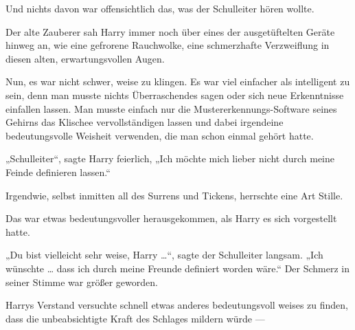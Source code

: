 Und nichts davon war offensichtlich das, was der Schulleiter hören wollte.

Der alte Zauberer sah Harry immer noch über eines der ausgetüftelten Geräte hinweg an, wie eine gefrorene Rauchwolke, eine schmerzhafte Verzweiflung in diesen alten, erwartungsvollen Augen.

Nun, es war nicht schwer, weise zu klingen. Es war viel einfacher als intelligent zu sein, denn man musste nichts Überraschendes sagen oder sich neue Erkenntnisse einfallen lassen. Man musste einfach nur die Mustererkennungs-Software seines Gehirns das Klischee vervollständigen lassen und dabei irgendeine bedeutungsvolle Weisheit verwenden, die man schon einmal gehört hatte.

„Schulleiter“, sagte Harry feierlich,
„Ich möchte mich lieber nicht durch meine Feinde definieren lassen.“

Irgendwie, selbst inmitten all des Surrens und Tickens, herrschte eine Art Stille.

Das war etwas bedeutungsvoller herausgekommen, als Harry es sich vorgestellt hatte.

„Du bist vielleicht sehr weise, Harry …“, sagte der Schulleiter langsam.
„Ich wünschte … dass ich durch meine Freunde definiert worden wäre.“ Der Schmerz in seiner Stimme war größer geworden.

Harrys Verstand versuchte schnell etwas anderes bedeutungsvoll weises zu finden, dass die unbeabsichtigte Kraft des Schlages mildern würde —

